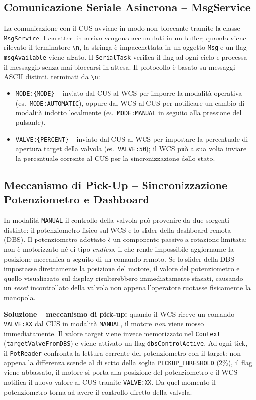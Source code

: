 \documentclass[12pt, a4paper]{article}
\begin{document}
\subsection{Comunicazione Seriale Asincrona -- MsgService}

La comunicazione con il CUS avviene in modo non bloccante tramite la classe \texttt{MsgService}. I caratteri in arrivo vengono accumulati in un buffer; quando viene rilevato il terminatore \texttt{\textbackslash n}, la stringa è impacchettata in un oggetto \texttt{Msg} e un flag \texttt{msgAvailable} viene alzato. Il \texttt{SerialTask} verifica il flag ad ogni ciclo e processa il messaggio senza mai bloccarsi in attesa. Il protocollo è basato su messaggi ASCII distinti, terminati da \texttt{\textbackslash n}:

\begin{itemize}
    \item \texttt{MODE:\{MODE\}} -- inviato dal CUS al WCS per imporre la modalità operativa (es.\ \texttt{MODE:AUTOMATIC}), oppure dal WCS al CUS per notificare un cambio di modalità indotto localmente (es.\ \texttt{MODE:MANUAL} in seguito alla pressione del pulsante).
    \item \texttt{VALVE:\{PERCENT\}} -- inviato dal CUS al WCS per impostare la percentuale di apertura target della valvola (es.\ \texttt{VALVE:50}); il WCS può a sua volta inviare la percentuale corrente al CUS per la sincronizzazione dello stato.
\end{itemize}

\subsection{Meccanismo di Pick-Up -- Sincronizzazione Potenziometro e Dashboard}
\label{sec:pickup}

In modalità \texttt{MANUAL} il controllo della valvola può provenire da due sorgenti distinte: il potenziometro fisico sul WCS e lo slider della dashboard remota (DBS). Il potenziometro adottato è un componente passivo a rotazione limitata: non è motorizzato né di tipo \textit{endless}, il che rende impossibile aggiornarne la posizione meccanica a seguito di un comando remoto. Se lo slider della DBS impostasse direttamente la posizione del motore, il valore del potenziometro e quello visualizzato sul display risulterebbero immediatamente sfasati, causando un \textit{reset} incontrollato della valvola non appena l'operatore ruotasse fisicamente la manopola.

\textbf{Soluzione -- meccanismo di pick-up:} quando il WCS riceve un comando \texttt{VALVE:XX} dal CUS in modalità \texttt{MANUAL}, il motore \emph{non} viene mosso immediatamente. Il valore target viene invece memorizzato nel \texttt{Context} (\texttt{targetValveFromDBS}) e viene attivato un flag \texttt{dbsControlActive}. Ad ogni tick, il \texttt{PotReader} confronta la lettura corrente del potenziometro con il target: non appena la differenza scende al di sotto della soglia \texttt{PICKUP\_THRESHOLD} (2\%), il flag viene abbassato, il motore si porta alla posizione del potenziometro e il WCS notifica il nuovo valore al CUS tramite \texttt{VALVE:XX}. Da quel momento il potenziometro torna ad avere il controllo diretto della valvola.
\end{document}
